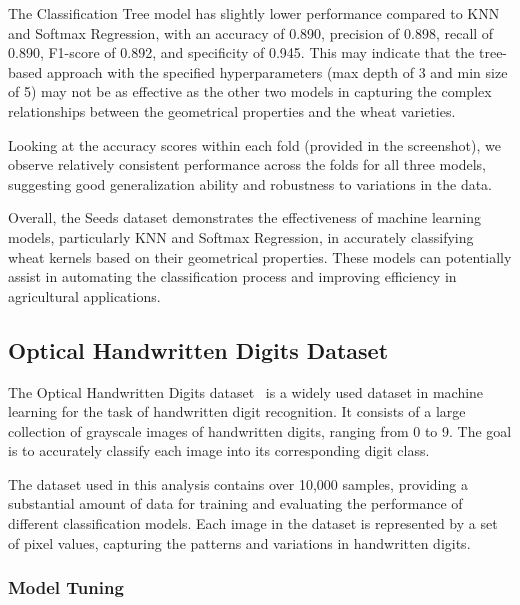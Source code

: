 \documentclass[letterpaper,10pt]{article}
\begin{document}
The Classification Tree model has slightly lower performance compared to KNN and Softmax Regression, with an accuracy of 0.890, precision of 0.898, recall of 0.890, F1-score of 0.892, and specificity of 0.945. This may indicate that the tree-based approach with the specified hyperparameters (max depth of 3 and min size of 5) may not be as effective as the other two models in capturing the complex relationships between the geometrical properties and the wheat varieties. \par

Looking at the accuracy scores within each fold (provided in the screenshot), we observe relatively consistent performance across the folds for all three models, suggesting good generalization ability and robustness to variations in the data.\par
Overall, the Seeds dataset demonstrates the effectiveness of machine learning models, particularly KNN and Softmax Regression, in accurately classifying wheat kernels based on their geometrical properties. These models can potentially assist in automating the classification process and improving efficiency in agricultural applications.\par

\subsection{Optical Handwritten Digits Dataset}

The Optical Handwritten Digits dataset~\cite{misc_optical_recognition_of_handwritten_digits_80} is a widely used dataset in machine learning for the task of handwritten digit recognition. It consists of a large collection of grayscale images of handwritten digits, ranging from 0 to 9. The goal is to accurately classify each image into its corresponding digit class.

The dataset used in this analysis contains over 10,000 samples, providing a substantial amount of data for training and evaluating the performance of different classification models. Each image in the dataset is represented by a set of pixel values, capturing the patterns and variations in handwritten digits.

\subsubsection{Model Tuning}
\end{document}
